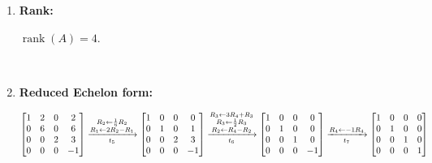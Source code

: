 \begin{enumerate}
\item
    \textbf{Rank:}
    \begin{answer}
        $
        \operatorname{rank}(A)=4.
        $
    \end{answer} \\

\item 
    \textbf{Reduced Echelon form:} \\[1.0em]

    \begin{answer}
        $\begin{bmatrix}
            1 & 2 & 0 & 2 \\
            0 & 6 & 0 & 6 \\
            0 & 0 & 2 & 3 \\
            0 & 0 & 0 & -1
        \end{bmatrix}
        \xrightarrow [t_5]{
            \substack{
                R_2 \leftarrow \frac{1}{6}R_2 \\
                R_1 \leftarrow 2R_2 - R_1
            }
        }
        \begin{bmatrix}
            1 & 0 & 0 & 0 \\
            0 & 1 & 0 & 1 \\
            0 & 0 & 2 & 3 \\
            0 & 0 & 0 & -1
        \end{bmatrix}
        \xrightarrow [t_6]{
            \substack{
                R_3 \leftarrow 3R_4 + R_3 \\
                R_3 \leftarrow \frac{1}{2}R_3 \\
                R_2 \leftarrow R_4 - R_2
            }
        }
        \begin{bmatrix}
            1 & 0 & 0 & 0 \\
            0 & 1 & 0 & 0 \\
            0 & 0 & 1 & 0 \\
            0 & 0 & 0 & -1
        \end{bmatrix} \\[0.5em]
        \xrightarrow [t_7]{R_4 \leftarrow -1R_4}
        \begin{bmatrix}
            1 & 0 & 0 & 0 \\
            0 & 1 & 0 & 0 \\
            0 & 0 & 1 & 0 \\
            0 & 0 & 0 & 1
        \end{bmatrix}
        $
    \end{answer}

\end{enumerate}